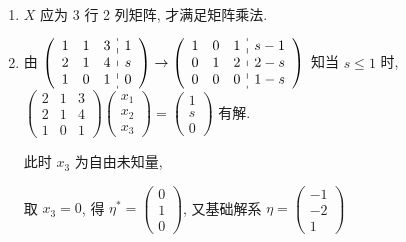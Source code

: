 	 \paragraph{} %
		 \begin{enumerate}
			 \item %
			       \( X \) 应为 3 行 2 列矩阵, 才满足矩阵乘法.
			 \item %
			       由 \( \left(\begin{array}{ccc:c}
					       1 & 1 & 3 & 1 \\
					       2 & 1 & 4 & s \\
					       1 & 0 & 1 & 0
				       \end{array}\right)
			       \rightarrow
			       \left(\begin{array}{ccc:c}
					       1 & 0 & 1 & s-1 \\
					       0 & 1 & 2 & 2-s \\
					       0 & 0 & 0 & 1-s
				       \end{array}\right) \) 知当 \( s \leq 1 \) 时, \( \begin{pmatrix}
				       2 & 1 & 3 \\
				       2 & 1 & 4 \\
				       1 & 0 & 1
			       \end{pmatrix}\begin{pmatrix}
				       x_{1} \\
				       x_{2} \\
				       x_{3}
			       \end{pmatrix} = \begin{pmatrix}
				       1 \\
				       s \\
				       0
			       \end{pmatrix} \) 有解.

			       此时 \( x_{3} \) 为自由未知量,

			       取 \( x_{3} = 0 \), 得 \( \eta^{*} = \begin{pmatrix}
				       0 \\
				       1 \\
				       0
			       \end{pmatrix} \), 又基础解系 \( \eta = \begin{pmatrix}
				       -1 \\
				       -2 \\
				       1
			       \end{pmatrix} \)


\end{enumerate}
